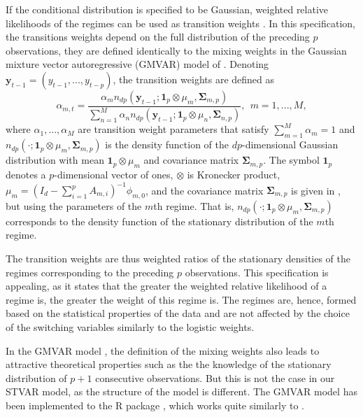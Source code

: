 \documentclass[nojss]{jss}
\begin{document}
If the conditional distribution is specified to be Gaussian, weighted relative likelihoods of the regimes can be used as transition weights \citep{Lanne+Virolainen:2024}. In this specification, the transitions weights depend on the full distribution of the preceding $p$ observations, they are defined identically to the mixing weights in the Gaussian mixture vector autoregressive (GMVAR) model of \cite{Kalliovirta+Meitz+Saikkonen:2016}.
Denoting $\boldsymbol{y}_{t-1}=(y_{t-1},...,y_{t-p})$, the transition weights are defined as
\begin{equation}\label{eq:alpha_mt}
\alpha_{m,t} = \frac{\alpha_m n_{dp}(\boldsymbol{y}_{t-1};\boldsymbol{1}_p\otimes \mu_m, \boldsymbol{\Sigma}_{m,p})}{\sum_{n=1}^M \alpha_n n_{dp}(\boldsymbol{y}_{t-1};\boldsymbol{1}_p\otimes \mu_n, \boldsymbol{\Sigma}_{n,p})}, \ \ m=1,...,M,
\end{equation}
where $\alpha_1,...,\alpha_M$ are transition weight parameters that satisfy $\sum_{m=1}^M \alpha_m=1$ and $n_{dp}(\cdot;\boldsymbol{1}_p\otimes \mu_m, \boldsymbol{\Sigma}_{m,p})$ is the density function of the $dp$-dimensional Gaussian distribution with mean $\boldsymbol{1}_p\otimes \mu_m$ and covariance matrix $\boldsymbol{\Sigma}_{m,p}$. The symbol $\boldsymbol{1}_p$ denotes a $p$-dimensional vector of ones, $\otimes$ is Kronecker product, $\mu_m=(I_d - \sum_{i=1}^pA_{m,i})^{-1}\phi_{m,0}$, and the covariance matrix $\boldsymbol{\Sigma}_{m,p}$ is given in \citet[Equation~(2.1.39)]{Lutkepohl:2005}, but using the parameters of the $m$th regime. That is, $n_{dp}(\cdot;\boldsymbol{1}_p\otimes \mu_m, \boldsymbol{\Sigma}_{m,p})$ corresponds to the density function of the stationary distribution of the $m$th regime.

The transition weights are thus weighted ratios of the stationary densities of the regimes corresponding to the preceding $p$ observations. This specification is appealing, as it states that the greater the weighted relative likelihood of a regime is, the greater the weight of this regime is. The regimes are, hence, formed based on the statistical properties of the data and are not affected by the choice of the switching variables similarly to the logistic weights.

In the GMVAR model \citep{Kalliovirta+Meitz+Saikkonen:2016}, the definition of the mixing weights also leads to attractive theoretical properties such as the the knowledge of the stationary distribution of $p+1$ consecutive observations. But this is not the case in our STVAR model, as the structure of the model is different. The GMVAR model has been implemented to the R package  \citep{gmvarkit}, which works quite similarly to .
\end{document}
